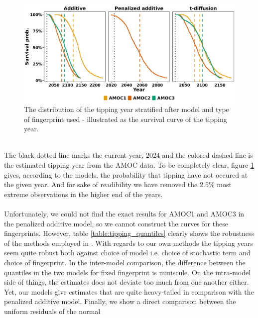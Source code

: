 \begin{figure}[h!]
    \begin{center}
        \includegraphics[scale = .096]{figures/surival_curve_first97.5.jpeg}
        \caption{The distribution of the tipping year stratified after model and type of fingerprint used - illustrated as the survival curve of the tipping year.}
        \label{figure:surival_curve_taus}
    \end{center}
\end{figure}\\
The black dotted line marks the current year, $2024$ and the colored dashed line is the estimated tipping year from the AMOC data. To be completely clear, figure \ref{figure:surival_curve_taus} gives, according to the models, the probability that tipping have not occured at the given year. And for sake of readibility we have removed the $2.5\%$ most extreme observations in the higher end of the years.\\\\
Unfortunately, we could not find the exact results for AMOC1 and AMOC3 in the penalized additive model, so we cannot construct the curves for these fingerprints. However, table \ref{table:tipping_quantiles} clearly shows the robustness of the methods employed in \cite{Ditlevsen2023}. With regards to our own methods the tipping years seem quite robust both against choice of model i.e. choice of stochastic term and choice of fingerprint. In the inter-model comparison, the difference between the quantiles in the two models for fixed fingerprint is miniscule. On the intra-model side of things, the estimates does not deviate too much from one another either. Yet, our models give estimates that are quite heavy-tailed in comparison with the penalized additive model.
\newpage
\noindent Finally, we show a direct comparison between the uniform residuals of the normal

